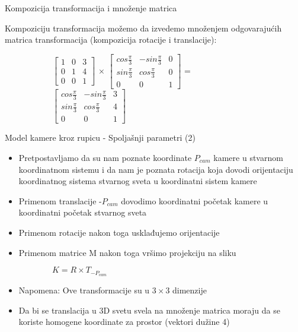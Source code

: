 \documentclass[bookmarks=true,bookmarksopen=true,pdfborder={0 0 0},pdfhighlight={/N},linkbordercolor={.5 .5 .5},implicit=false,unicode,xcolor={table}]{beamer}
\begin{document}
\begin{frame}{Kompozicija transformacija i množenje matrica}

  Kompoziciju transformacija možemo da izvedemo množenjem odgovarajućih
  matrica transformacija (kompozicija rotacije i translacije):
  \begin{figure}
    \begin{subfigure}{10cm}
      $\begin{bmatrix}
        1 & 0 & 3\\
        0 & 1 & 4\\
        0 & 0 & 1
      \end{bmatrix}$
      $\times$
      $\begin{bmatrix}
        cos\frac{\pi}{3} & -sin\frac{\pi}{3} & 0\\
        sin\frac{\pi}{3} & cos\frac{\pi}{3} & 0\\
        0 & 0 & 1
      \end{bmatrix}$
      =
      $\begin{bmatrix}
        cos\frac{\pi}{3} & -sin\frac{\pi}{3} & 3\\
        sin\frac{\pi}{3} & cos\frac{\pi}{3} & 4\\
        0 & 0 & 1
      \end{bmatrix}$
    \end{subfigure}
  \end{figure}

\end{frame}

\begin{frame}{Model kamere kroz rupicu - Spoljašnji parametri (2)}

  \begin{itemize}
    \item Pretpostavljamo da su nam poznate koordinate $P_{cam}$ kamere u stvarnom koordinatnom sistemu i da nam je poznata
          rotacija koja dovodi orijentaciju koordinatnog sistema stvarnog sveta u koordinatni sistem kamere
    \item Primenom translacije -$P_{cam}$ dovodimo koordinatni početak kamere u koordinatni početak stvarnog sveta
    \item Primenom rotacije nakon toga usklađujemo orijentacije
    \item Primenom matrice M nakon toga vršimo projekciju na sliku
  \end{itemize}

  \begin{figure}
    \begin{subfigure}{3cm}
      $K = R \times T_{-P_{cam}}$
    \end{subfigure}
  \end{figure}

  \begin{itemize}
    \item Napomena: Ove transformacije su u $3 \times 3$ dimenzije
    \item Da bi se translacija u 3D svetu svela na množenje matrica moraju da se koriste homogene koordinate za prostor (vektori dužine 4)
  \end{itemize}

\end{frame}
\end{document}
